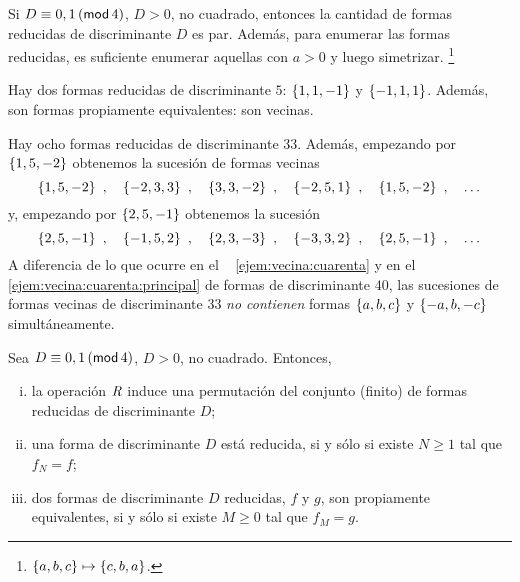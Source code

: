 \begin{coroIndefinidas}\label{coro:indefinidas:reducidas}
	Si $D\equiv 0,1\tmodulo[4]$, $D>0$, no cuadrado, entonces
	la cantidad de formas reducidas de discriminante $D$ es par.
	Adem\'as, para enumerar las formas reducidas, es suficiente
	enumerar aquellas con $a>0$ y luego simetrizar.%
	\footnote{
		$\binaria{a,b,c}\mapsto\binaria{c,b,a}$.
	}
\end{coroIndefinidas}

\begin{ejemIndefinidas}\label{ejem:reducidas:cinco}
	Hay dos formas reducidas de discriminante $5$:
	$\binaria{1,1,-1}$ y $\binaria{-1,1,1}$. Adem\'as, son
	formas propiamente equivalentes: son vecinas.
\end{ejemIndefinidas}

\begin{ejemIndefinidas}\label{ejem:reducidas:veintinueve}
	Hay ocho formas reducidas de discriminante $33$.
	Adem\'as, empezando por $\binaria{1,5,-2}$ obtenemos la sucesi\'on
	de formas vecinas
	\begin{displaymath}
		\binaria{1,5,-2}\dispcomma\quad
			\binaria{-2,3,3}\dispcomma\quad
			\binaria{3,3,-2}\dispcomma\quad
			\binaria{-2,5,1}\dispcomma\quad
			\binaria{1,5,-2}\dispcomma\quad\dots
	\end{displaymath}
	y, empezando por $\binaria{2,5,-1}$ obtenemos la sucesi\'on
	\begin{displaymath}
		\binaria{2,5,-1}\dispcomma\quad
			\binaria{-1,5,2}\dispcomma\quad
			\binaria{2,3,-3}\dispcomma\quad
			\binaria{-3,3,2}\dispcomma\quad
			\binaria{2,5,-1}\dispcomma\quad\dots
	\end{displaymath}
	A diferencia de lo que ocurre en el \ejemname~%
	\ref{ejem:vecina:cuarenta} y en el \ejemname~%
	\ref{ejem:vecina:cuarenta:principal} de formas de discriminante $40$,
	las sucesiones de formas vecinas de discriminante $33$
	\emph{no contienen} formas $\binaria{a,b,c}$ y $\binaria{-a,b,-c}$
	simult\'aneamente.
\end{ejemIndefinidas}

\begin{teoIndefinidas}\label{teo:indefinidas}
	Sea $D\equiv 0,1\tmodulo[4]$, $D>0$, no cuadrado. Entonces,
	\begin{enumerate}[(i)]
		\item\label{item:teo:indefinidas:vecina}
			la operaci\'on $\rneigh$ induce una permutaci\'on
			del conjunto (finito) de formas reducidas
			de discriminante $D$;
		\item\label{item:teo:indefinidas:reducida}
			una forma de discriminante $D$ est\'a reducida,
			si y s\'olo si existe $N\geq 1$ tal que $f_N=f$;
		\item\label{item:teo:indefinidas:equivalencia}
			dos formas de discriminante $D$ reducidas, $f$ y $g$,
			son propiamente equivalentes, si y s\'olo si
			existe $M\geq 0$ tal que $f_M=g$.
	\end{enumerate}
\end{teoIndefinidas}

